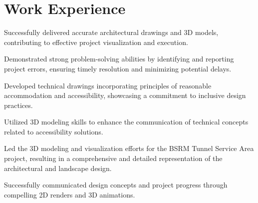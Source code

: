 \begin{minipage}[t]{0.63\textwidth}
  \section{Work Experience}
    \summaryPoints{}
    
    \vspace{15pt} %
    
    \begin{tightemize}
      \item Successfully delivered accurate architectural drawings and 3D models, contributing to effective project visualization and execution.
      \item Demonstrated strong problem-solving abilities by identifying and reporting project errors, ensuring timely resolution and minimizing potential delays.
    \end{tightemize}
  \sectionsep

    \summaryPoints{}
    \vspace{5pt}
    \begin{tightemize}
      \item Developed technical drawings incorporating principles of reasonable accommodation and accessibility, showcasing a commitment to inclusive design practices.
      \item Utilized 3D modeling skills to enhance the communication of technical concepts related to accessibility solutions.
    \end{tightemize}
  \sectionsep

    \summaryPoints{}
    \vspace{5pt}
    \begin{tightemize}
      \item Led the 3D modeling and visualization efforts for the BSRM Tunnel Service Area project, resulting in a comprehensive and detailed representation of the architectural and landscape design.
      \item Successfully communicated design concepts and project progress through compelling 2D renders and 3D animations.
    \end{tightemize}
  \sectionsep


\end{minipage}
